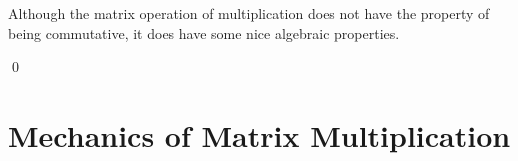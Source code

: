 \documentclass[9pt,t]{beamer}
\begin{document}
\begin{frame}
Although the matrix operation of multiplication does not have
the property of being commutative,
it does have some nice algebraic properties.  

\th[th:MatMultWellBehaved]
\pause
\pf
{}

{}
\qed
\end{frame}




\section{Mechanics of Matrix Multiplication}
\end{document}
